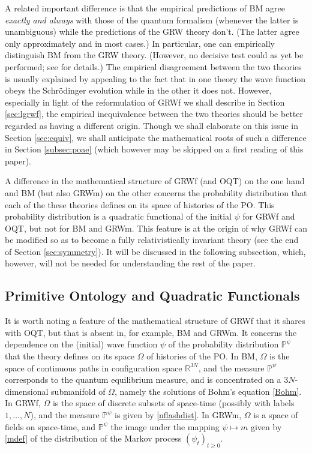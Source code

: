 \documentclass[12pt]{article}
\newcommand{\PPP}{\mathbb{P}}
\newcommand{\RRR}{\mathbb{R}}
\begin{document}
A related important difference is that the empirical
predictions of {\sf BM} agree \emph{exactly and always} with
those of the quantum formalism (whenever the latter is unambiguous) while the predictions of the {\sf GRW} theory don't. (The latter agree only approximately and in most cases.)
In particular, one can empirically distinguish {\sf BM} from the {\sf GRW}
theory. (However, no decisive test could as yet be performed; see
\citep{BG03} for details.)
The empirical disagreement between the two theories is usually explained by appealing to the fact that in one theory the wave function obeys the Schr\"odin\-ger evolution while in the other it does not. However, especially in light of the reformulation of {\sf GRWf} we shall describe  in Section \ref{sec:lgrwf}, the empirical inequivalence between the two theories should be better regarded as having a different origin. Though we shall elaborate on this issue in  Section \ref{sec:equiv},  we shall anticipate  the mathematical roots of such a difference in Section  \ref{subsec:poae} (which however may be skipped on a first reading of this paper).


A difference in the mathematical structure of {\sf GRWf} (and {\sf OQT}) on the one hand and {\sf BM} (but also {\sf GRWm}) on the other concerns the probability distribution 
that each of the these theories defines on its space of histories of the PO. 
This probability distribution is a quadratic functional of the initial $\psi$ for {\sf GRWf} and {\sf OQT}, but not for {\sf BM} and {\sf GRWm}. This feature is at the origin of why {\sf GRWf} can be modified so as to become a fully relativistically invariant theory (see the end of Section \ref{sec:symmetry}). It will be discussed in the following subsection, which, however, will not be needed for understanding the rest of the paper.

\subsection{Primitive Ontology and Quadratic Functionals}
\label{sec:appendix}
It is worth noting a feature of the mathematical structure of {\sf GRWf} that it shares with {\sf OQT}, but that is absent in, for example, {\sf BM} and {\sf GRWm}. It concerns the dependence on the (initial) wave function $\psi$ of the probability distribution $\PPP^{\psi}$ that the theory defines on its space $\Omega$ of histories of the PO. 
In {\sf BM}, $\Omega$ is the space of continuous paths in configuration space $\RRR^{3N}$, and the measure $\PPP^\psi$ corresponds to the quantum equilibrium measure, and is concentrated on a
$3N$-dimensional submanifold of $\Omega$, namely the solutions of Bohm's equation \eqref{Bohm}. In {\sf GRWf}, $\Omega$ is the space of discrete subsets of space-time (possibly with labels $1,\ldots,N$), and the measure $\PPP^\psi$ is given by \eqref{nflashdist}. In {\sf GRWm}, $\Omega$ is a space of fields on space-time, and $\PPP^\psi$ the image under the mapping $\psi \mapsto m$ given by \eqref{mdef} of the distribution of the Markov process $(\psi_t)_{t \geq 0}$.
\end{document}
